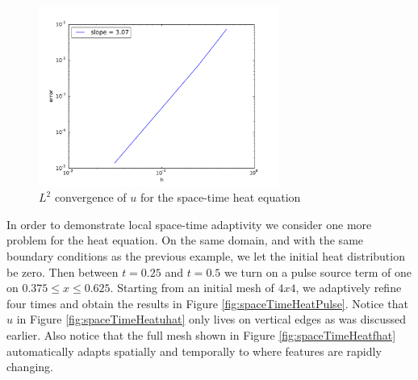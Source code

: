 \documentclass[preprint,12pt]{elsarticle}
\begin{document}
\begin{figure}[!ht]
	\centering
	\includegraphics[width=0.7\textwidth]{SpaceTimeHeat/convergence}
	\caption{$L^2$ convergence of $u$ for the space-time heat equation}
	\label{fig:spaceTimeHeatConvergence}
\end{figure}

In order to demonstrate local space-time adaptivity we consider one more problem for the heat equation. 
On the same domain, and with the same boundary conditions as the previous example, we let the initial heat distribution be zero.
Then between $t=0.25$ and $t=0.5$ we turn on a pulse source term of one on $0.375\leq x\leq 0.625$. 
Starting from an initial mesh of $4x4$, we adaptively refine four times and obtain the results in Figure \ref{fig:spaceTimeHeatPulse}.
Notice that $\hat u$ in Figure \ref{fig:spaceTimeHeatuhat} only lives on vertical edges as was discussed earlier.
Also notice that the full mesh shown in Figure \ref{fig:spaceTimeHeatfhat} automatically adapts spatially and temporally to where features are rapidly changing. 
\end{document}
